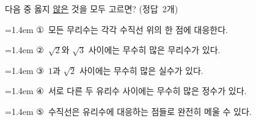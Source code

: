다음 중 옳지 \underline{않은} 것을 모두 고르면? \mbox{(정답 2개)}
\par\medskip\par\noindent\hangindent=1.4em {\small ①}\ 모든 무리수는 각각 수직선 위의 한 점에 대응한다.\par\noindent\hangindent=1.4em {\small ②}\ $\sqrt{2}$와 $\sqrt{3}$ 사이에는 무수히 많은 무리수가 있다.\par\noindent\hangindent=1.4em {\small ③}\ $1$과 $\sqrt{2}$ 사이에는 무수히 많은 실수가 있다.\par\noindent\hangindent=1.4em {\small ④}\ 서로 다른 두 유리수 사이에는 무수히 많은 정수가 있다.\par\noindent\hangindent=1.4em {\small ⑤}\ 수직선은 유리수에 대응하는 점들로 완전히 메울 수 있다.\par\medskip
